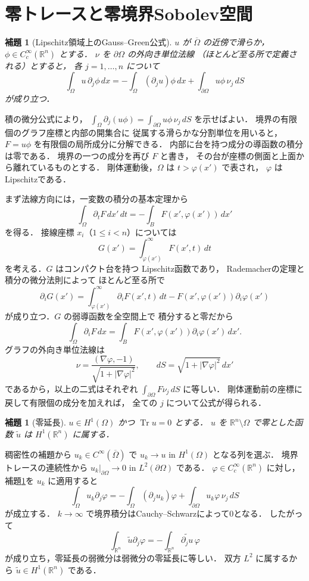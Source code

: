 \documentclass[a5paper,10pt,onecolumn]{jsarticle}
\makeatletter
\theoremstyle{mathnotetheorem}
\newtheorem{lemma}[theorem]{補題}
\renewcommand{\proofname}{証明}
\renewenvironment{proof}[1][\proofname]{%
  \par\pushQED{\qed}\normalfont\topsep4\p@\@plus2\p@\relax
  \trivlist\item[\hskip\labelsep\bfseries #1]\ignorespaces
}{\popQED\endtrivlist\@endpefalse}
\makeatother
\begin{document}
\section{零トレースと零境界Sobolev空間}
\begin{lemma}[Lipschitz領域上のGauss--Green公式]
\label{lem:lip-green}
$u$ が $\overline\Omega$ の近傍で滑らか，
$\phi\in C_c^\infty(\mathbb R^n)$ とする．
$\nu$ を $\partial\Omega$ の外向き単位法線
（ほとんど至る所で定義される）とすると，
各 $j=1,\ldots,n$ について
\[
 \int_\Omega u\,\partial_j\phi\,dx
 =-\int_\Omega(\partial_ju)\phi\,dx
 +\int_{\partial\Omega}u\phi\,\nu_j\,dS
\]
が成り立つ．
\end{lemma}
\begin{proof}
積の微分公式により，
$\int_\Omega\partial_j(u\phi)
=\int_{\partial\Omega}u\phi\,\nu_j\,dS$
を示せばよい．
境界の有限個のグラフ座標と内部の開集合に
従属する滑らかな分割単位を用いると，
$F=u\phi$ を有限個の局所成分に分解できる．
内部に台を持つ成分の導函数の積分は零である．
境界の一つの成分を再び $F$ と書き，
その台が座標の側面と上面から離れているものとする．
剛体運動後，$\Omega$ は
$t>\varphi(x')$ で表され，
$\varphi$ はLipschitzである．

まず法線方向には，一変数の積分の基本定理から
\[
 \int_{\Omega}\partial_tF\,dx'\,dt
 =-\int_B F(x',\varphi(x'))\,dx'
\]
を得る．
接線座標 $x_i$（$1\le i<n$）については
\[
 G(x')=\int_{\varphi(x')}^\infty F(x',t)\,dt
\]
を考える．$G$ はコンパクト台を持つ
Lipschitz函数であり，
Rademacherの定理と積分の微分法則によって
ほとんど至る所で
\[
 \partial_iG(x')
 =\int_{\varphi(x')}^\infty\partial_iF(x',t)\,dt
 -F(x',\varphi(x'))\partial_i\varphi(x')
\]
が成り立つ．$G$ の弱導函数を全空間上で
積分すると零だから
\[
 \int_\Omega\partial_iF\,dx
 =\int_BF(x',\varphi(x'))\partial_i\varphi(x')\,dx'.
\]
グラフの外向き単位法線は
\[
 \nu=\frac{(\nabla\varphi,-1)}
           {\sqrt{1+|\nabla\varphi|^2}},
 \qquad
 dS=\sqrt{1+|\nabla\varphi|^2}\,dx'
\]
であるから，以上の二式はそれぞれ
$\int_{\partial\Omega}F\nu_j\,dS$ に等しい．
剛体運動前の座標に戻して有限個の成分を加えれば，
全ての $j$ について公式が得られる．
\end{proof}

\begin{lemma}[零延長]
$u\in H^1(\Omega)$ かつ $\operatorname{Tr}u=0$ とする．
$u$ を $\mathbb R^n\setminus\Omega$ で零とした函数
$\widetilde u$ は $H^1(\mathbb R^n)$ に属する．
\end{lemma}
\begin{proof}
稠密性の補題から $u_k\in C^\infty(\overline\Omega)$ で
$u_k\to u$ in $H^1(\Omega)$ となる列を選ぶ．
境界トレースの連続性から
$u_k|_{\partial\Omega}\to0$ in $L^2(\partial\Omega)$ である．
$\varphi\in C_c^\infty(\mathbb R^n)$ に対し，
補題\ref{lem:lip-green}を $u_k$ に適用すると
\[
 \int_\Omega u_k\partial_j\varphi
 =-\int_\Omega (\partial_j u_k)\varphi
   +\int_{\partial\Omega}u_k\varphi\,\nu_j\,dS
\]
が成立する．
$k\to\infty$ で境界積分はCauchy--Schwarzによって0となる．
したがって
\[
 \int_{\mathbb R^n}\widetilde u\partial_j\varphi
 =-\int_{\mathbb R^n}
   \widetilde{\partial_j u}\,\varphi
\]
が成り立ち，零延長の弱微分は弱微分の零延長に等しい．
双方 $L^2$ に属するから $\widetilde u\in H^1(\mathbb R^n)$ である．
\end{proof}
\end{document}
